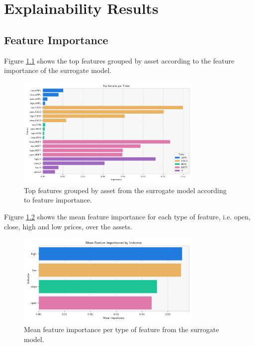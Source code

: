 \chapter{Explainability Results} \label{app:explainability}

\section{Feature Importance} \label{app:feature_importance}

Figure \ref{fig:feature_importance_by_asset} shows the top features grouped by asset according to the feature importance of the surrogate model. 

\begin{figure}
    \centering
    \includegraphics[width=0.8\textwidth]{figures/feature_importance_top_features_by_ticker.png}
    \caption{Top features grouped by asset from the surrogate model according to feature importance.}
    \label{fig:feature_importance_by_asset}
\end{figure}

Figure \ref{fig:mean_feature_importance_by_feature} shows the mean feature importance for each type of feature, i.e. open, close, high and low prices, over the assets.

\begin{figure}
    \centering
    \includegraphics[width=0.8\textwidth]{figures/feature_importance_mean_indicator.png}
    \caption{Mean feature importance per type of feature from the surrogate model.}
    \label{fig:mean_feature_importance_by_feature}
\end{figure}

